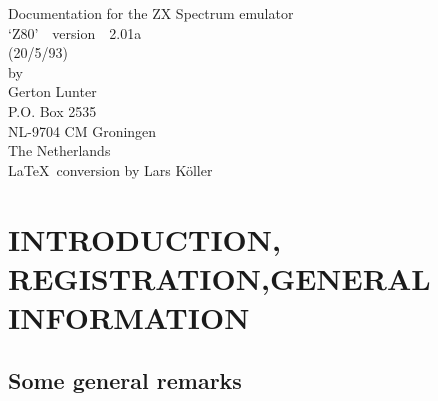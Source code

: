
%
%

%
%
\addtolength{\textheight}{68pt}

\setlength{\voffset}{-4.0mm}
\addtolength{\oddsidemargin}{6.0mm}
\addtolength{\evensidemargin}{-18.0mm}



\renewcommand{\baselinestretch}{1}

%
%


%
%
\pagestyle{empty}

\begin{center}
  \large
    Documentation for the ZX Spectrum emulator\\[2.0cm]
  \Huge
    `Z80'\large~~version~~\huge 2.01a\\
  \large
   (20/5/93)\\
  \large
    \vspace{2.5cm}
    by\\
    \vspace{7.5cm}
  \LARGE
        Gerton Lunter \\
  \large
	P.O. Box 2535 \\
	NL-9704 CM  Groningen \\
        The Netherlands \\
  \vspace{2.5cm}
  \LaTeX~conversion by Lars K\"oller \\
\end{center}

\cleardoublepage


%
%
\pagestyle{headings}

\tableofcontents
\cleardoublepage


%
%


\section{INTRODUCTION, REGISTRATION,\protect \newline GENERAL INFORMATION}


\subsection{Some general remarks}


